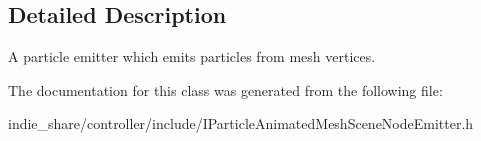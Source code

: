 \subsection{Detailed Description}
A particle emitter which emits particles from mesh vertices. 

The documentation for this class was generated from the following file\+:\begin{DoxyCompactItemize}
\item 
indie\+\_\+share/controller/include/I\+Particle\+Animated\+Mesh\+Scene\+Node\+Emitter.\+h\end{DoxyCompactItemize}
